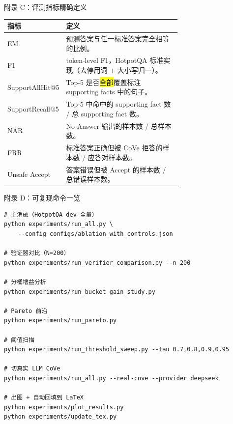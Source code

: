 \begin{frame}{附录 C：评测指标精确定义}
  \footnotesize
  \begin{tabular}{@{}lp{0.7\linewidth}@{}}
    \toprule
    \textbf{指标} & \textbf{定义} \\ \midrule
    EM & 预测答案与任一标准答案完全相等的比例。 \\
    F1 & token-level F1，HotpotQA 标准实现（去停用词 + 大小写归一）。 \\
    SupportAllHit@5 & Top-5 是否\hl{全部}覆盖标注 supporting facts 中的句子。 \\
    SupportRecall@5 & Top-5 中命中的 supporting fact 数 / 总 supporting fact 数。 \\
    NAR & No-Answer 输出的样本数 / 总样本数。 \\
    FRR & 标准答案正确但被 CoVe 拒答的样本数 / 应答对样本数。 \\
    Unsafe Accept & 答案错误但被 Accept 的样本数 / 总错误样本数。 \\
    \bottomrule
  \end{tabular}
\end{frame}

\begin{frame}[fragile]{附录 D：可复现命令一览}
  \footnotesize
  \begin{lstlisting}[style=shellstyle, basicstyle=\ttfamily\scriptsize]
# 主消融（HotpotQA dev 全量）
python experiments/run_all.py \
    --config configs/ablation_with_controls.json

# 验证器对比（N=200）
python experiments/run_verifier_comparison.py --n 200

# 分桶增益分析
python experiments/run_bucket_gain_study.py

# Pareto 前沿
python experiments/run_pareto.py

# 阈值扫描
python experiments/run_threshold_sweep.py --tau 0.7,0.8,0.9,0.95

# 切真实 LLM CoVe
python experiments/run_all.py --real-cove --provider deepseek

# 出图 + 自动回填到 LaTeX
python experiments/plot_results.py
python experiments/update_tex.py
  \end{lstlisting}
\end{frame}

